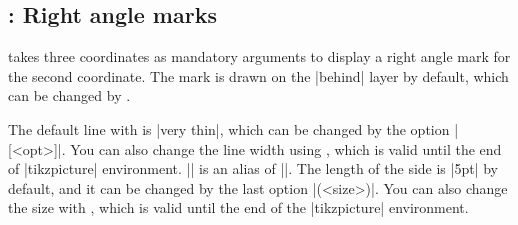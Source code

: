 



\subsection{\protect\cmd{\tzrightanglemark}: Right angle marks}
\label{ss:tzrightangle}

\icmd{\tzrightanglemark} takes three coordinates as mandatory arguments to display a right angle mark for the second coordinate. The mark is drawn on the |behind| layer by default, which can be changed by \icmd{\settzanglelayer}.

The default line with is |very thin|, which can be changed by the option |[<opt>]|. You can also change the line width using \icmd{\settzRAlinestyle}, which is valid until the end of |tikzpicture| environment.
|\settzRAlinestyle| is an alias of |\settzAAlinestyle|.
The length of the side is |5pt| by default, and it can be changed by the last option |(<size>)|.
You can also change the size with \icmd{\settzRAsize}, which is valid until the end of the |tikzpicture| environment.


